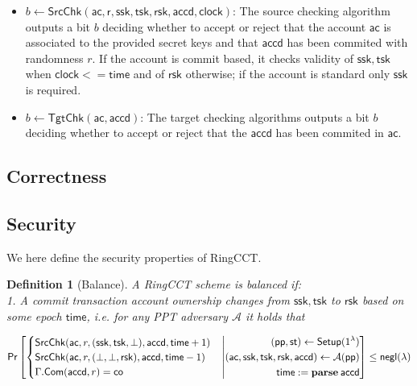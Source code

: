 \documentclass{article}      	%
\newtheorem{definition}{Definition}
\begin{document}
\begin{itemize}
\item $b \gets \mathsf{SrcChk}(\mathsf{ac,r,ssk,tsk,rsk,accd,clock})$: The source checking algorithm outputs a bit $b$ deciding whether to accept or reject that the account $\mathsf{ac}$ is associated to the provided secret keys and that $\mathsf{accd}$ has been commited with randomness $r$. If the account is commit based, it checks validity of $\mathsf{ssk,tsk}$ when $\mathsf{clock} <= \mathsf{time}$ and of $\mathsf{rsk}$ otherwise; if the account is standard only $\mathsf{ssk}$ is required.
\item $b \gets \mathsf{TgtChk}(\mathsf{ac,accd})$: The target checking algorithms outputs a bit $b$ deciding whether to accept or reject that the $\mathsf{accd}$ has been commited in $\mathsf{ac}$. 
\end{itemize}

\subsection{Correctness}

\subsection{Security}
We here define the security properties of RingCCT.

\begin{definition}[Balance] A RingCCT scheme is balanced if: \\
	1. A commit transaction account ownership changes from $\mathsf{ssk}, \mathsf{tsk}$ to $\mathsf{rsk}$ based on some epoch $\mathsf{time}$, i.e. for any PPT adversary $\mathcal{A}$ it holds that
\end{definition}
$\mathsf{Pr}\left[
    \begin{cases} 
	\mathsf{SrcChk}(\mathsf{ac}, r, (\mathsf{ssk}, \mathsf{tsk}, \perp), \mathsf{accd}, \mathsf{time}+1) \tabularnewline 
	\mathsf{SrcChk}(\mathsf{ac}, r, (\perp, \perp, \mathsf{rsk}), \mathsf{accd}, \mathsf{time}-1) \tabularnewline
        \Gamma.\mathsf{Com}(\mathsf{accd}, r) = \mathsf{co} 
    \end{cases} 
    \middle|(
    \begin{aligned}
	(\mathsf{pp}, \mathsf{st}) \gets \mathsf{Setup}(1^\lambda) \\
	\mathsf{ac}, \mathsf{ssk}, \mathsf{tsk}, \mathsf{rsk}, \mathsf{accd}) \gets \mathcal{A}(\mathsf{pp}) \\
    	\mathsf{time} := \mathbf{parse} \: \mathsf{accd} \\
    \end{aligned}
\right]
\leq \negl
$
\end{document}
